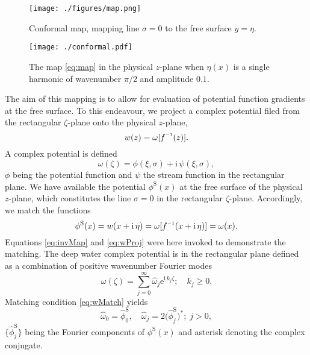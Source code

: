 \documentclass[a4paper,12pt]{article}
\newcommand{\mr}{\mathrm}
\renewcommand{\S}{^\mr{S}}
\newcommand{\ii}{\mr{i}\,}
\newcommand{\ee}{\mr{e}}
\renewcommand{\_}[1]{_\mr{#1}}
\let\Re\relax
\DeclareMathOperator\Re{Re}
\newcommand{\w}{w}
\newcommand{\h}{\hat}
\newcommand{\z}{z}
\newcommand{\x}{x}
\newcommand{\y}{y}
\newcommand{\zz}{\zeta}
\newcommand{\xx}{\xi}
\newcommand{\yy}{\sigma}
\newcommand{\zmap}{f}
\newcommand{\zzmap}{\zmap^{\raisebox{.2ex}{$\scriptscriptstyle-1$}}}
\newcommand{\ww}{\omega}
\renewcommand{\w}{w}
\newcommand{\surf}{\eta}
\begin{document}
\begin{figure}[h!ptb]%
\center
\texttt{[image: ./figures/map.png]}%
\caption{Conformal map, mapping line $\yy=0$ to the free surface $\y=\surf$.}%
\label{fig:map}%
\end{figure}
\begin{figure}[h!ptb]%
\centering
\texttt{[image: ./conformal.pdf]}%
\caption{The map \eqref{eq:map} in the physical $\z$-plane when $\eta(\x)$ is a single harmonic of wavenumber $\pi/2$ and amplitude $0.1$.}%
\label{fig:mapReg}%
\end{figure}

The aim of this mapping is to allow for evaluation of potential function gradients at the free surface. 
To this endeavour, we project a complex potential filed from the rectangular $\zz$-plane onto the physical $\z$-plane,
\begin{equation}
\w(\z) = \ww[\zzmap(\z)].
\label{eq:wProj}
\end{equation}
A complex potential is defined
\[ \ww(\zz) = \phi(\xx,\yy) + \ii \psi(\xx,\yy), \]
$\phi$ being the potential function and $\psi$ the stream function in the rectangular plane.
We have available the potential $\phi\S(\x)$ at the free surface of the physical $\z$-plane, which constitutes the line $\yy=0$ in the rectangular  $\zz$-plane. 
Accordingly, we match the functions
\begin{equation}
\phi\S(\x) = \Re \w(\x+\ii\surf) = \Re \ww[\zzmap(\x+\ii\surf)] = \Re \ww(\x).
\label{eq:wMatch}
\end{equation}
Equations \eqref{eq:invMap} and \eqref{eq:wProj} were here invoked to demonstrate the matching.
The deep water
 complex potential is  in the rectangular plane defined as a combination of positive wavenumber Fourier modes
\begin{equation}
\ww(\zz) = \sum_{j=0}^\infty \h\ww_j \ee^{\ii k_j \zz}; \quad k_j\geq 0.
\label{eq:w}
\end{equation}
Matching condition \eqref{eq:wMatch} yields
\begin{equation}
\h\ww_0 = \h\phi_0\S, \quad \h\ww_j = 2\big(\h\phi\S_j\big)^*;\; j>0, 
\label{eq:aj}
\end{equation}
$\{\h\phi\S_j\}$ being the Fourier components of $\phi\S(x)$ and asterisk denoting the complex conjugate.
\end{document}
